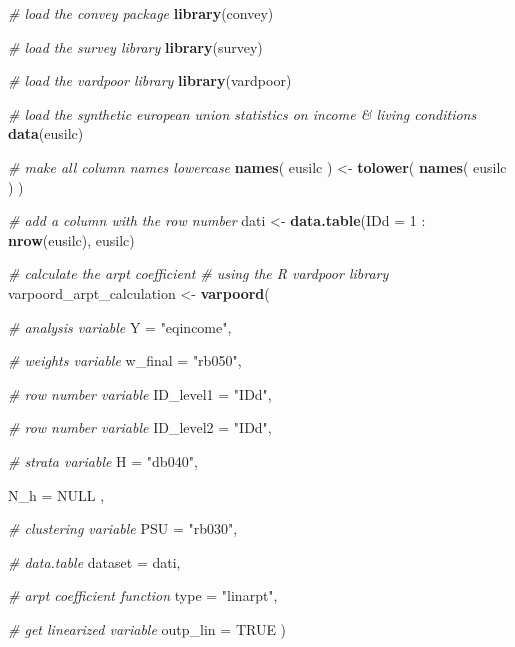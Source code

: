 \documentclass[]{book}
\newenvironment{Shaded}{\begin{snugshade}}{\end{snugshade}}
\newcommand{\KeywordTok}[1]{\textcolor[rgb]{0.13,0.29,0.53}{\textbf{{#1}}}}
\newcommand{\DataTypeTok}[1]{\textcolor[rgb]{0.13,0.29,0.53}{{#1}}}
\newcommand{\DecValTok}[1]{\textcolor[rgb]{0.00,0.00,0.81}{{#1}}}
\newcommand{\StringTok}[1]{\textcolor[rgb]{0.31,0.60,0.02}{{#1}}}
\newcommand{\CommentTok}[1]{\textcolor[rgb]{0.56,0.35,0.01}{\textit{{#1}}}}
\newcommand{\OtherTok}[1]{\textcolor[rgb]{0.56,0.35,0.01}{{#1}}}
\newcommand{\NormalTok}[1]{{#1}}
\theoremstyle{definition}
\theoremstyle{definition}
\theoremstyle{remark}
\begin{document}
\begin{Shaded}
\begin{Highlighting}[]
\CommentTok{# load the convey package}
\KeywordTok{library}\NormalTok{(convey)}

\CommentTok{# load the survey library}
\KeywordTok{library}\NormalTok{(survey)}

\CommentTok{# load the vardpoor library}
\KeywordTok{library}\NormalTok{(vardpoor)}

\CommentTok{# load the synthetic european union statistics on income & living conditions}
\KeywordTok{data}\NormalTok{(eusilc)}

\CommentTok{# make all column names lowercase}
\KeywordTok{names}\NormalTok{( eusilc ) <-}\StringTok{ }\KeywordTok{tolower}\NormalTok{( }\KeywordTok{names}\NormalTok{( eusilc ) )}

\CommentTok{# add a column with the row number}
\NormalTok{dati <-}\StringTok{ }\KeywordTok{data.table}\NormalTok{(}\DataTypeTok{IDd =} \DecValTok{1} \NormalTok{:}\StringTok{ }\KeywordTok{nrow}\NormalTok{(eusilc), eusilc)}

\CommentTok{# calculate the arpt coefficient}
\CommentTok{# using the R vardpoor library}
\NormalTok{varpoord_arpt_calculation <-}
\StringTok{    }\KeywordTok{varpoord}\NormalTok{(}
    
        \CommentTok{# analysis variable}
        \DataTypeTok{Y =} \StringTok{"eqincome"}\NormalTok{, }
        
        \CommentTok{# weights variable}
        \DataTypeTok{w_final =} \StringTok{"rb050"}\NormalTok{,}
        
        \CommentTok{# row number variable}
        \DataTypeTok{ID_level1 =} \StringTok{"IDd"}\NormalTok{,}
        
        \CommentTok{# row number variable}
        \DataTypeTok{ID_level2 =} \StringTok{"IDd"}\NormalTok{,}
        
        \CommentTok{# strata variable}
        \DataTypeTok{H =} \StringTok{"db040"}\NormalTok{, }
        
        \DataTypeTok{N_h =} \OtherTok{NULL} \NormalTok{,}
        
        \CommentTok{# clustering variable}
        \DataTypeTok{PSU =} \StringTok{"rb030"}\NormalTok{, }
        
        \CommentTok{# data.table}
        \DataTypeTok{dataset =} \NormalTok{dati, }
        
        \CommentTok{# arpt coefficient function}
        \DataTypeTok{type =} \StringTok{"linarpt"}\NormalTok{,}
      
        \CommentTok{# get linearized variable}
      \DataTypeTok{outp_lin =} \OtherTok{TRUE}
    \NormalTok{)}
\end{Highlighting}
\end{Shaded}
\end{document}
